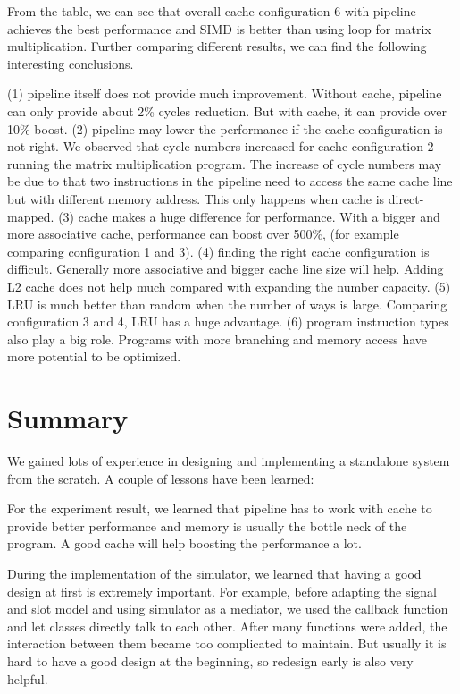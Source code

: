 \documentclass{sig-alternate}
\begin{document}
From the table, we can see that overall cache configuration 6 with pipeline achieves the best performance and SIMD is better than using loop for matrix multiplication. Further comparing different results, we can find the following interesting conclusions. 

(1) pipeline itself does not provide much improvement. Without cache, pipeline can only provide about 2\% cycles reduction. But with cache, it can provide over 10\% boost. (2) pipeline may lower the performance if the cache configuration is not right. We observed that cycle numbers increased for cache configuration 2  running the matrix multiplication program. The increase of cycle numbers may be due to that two instructions in the pipeline need to access the same cache line but with different memory address. This only happens when cache is direct-mapped. (3) cache makes a huge difference for performance. With a bigger and more associative cache, performance can boost over 500\%, (for example comparing configuration 1 and 3). (4) finding the right cache configuration is difficult. Generally more associative and bigger cache line size will help. Adding L2 cache does not help much compared with expanding the number capacity. (5) LRU is much better than random when the number of ways is large. Comparing configuration 3 and 4, LRU has a huge advantage. (6) program instruction types also play a big role. Programs with more branching and memory access have more potential to be optimized. 

\section{Summary}
We gained lots of experience in designing and implementing a standalone system from the scratch. A couple of lessons have been learned:

For the experiment result, we learned that pipeline has to work with cache to provide better performance and memory is usually the bottle neck of the program. A good cache will help boosting the performance a lot. 

During the implementation of the simulator, we learned that having a good design at first is extremely important. For example, before adapting the signal and slot model and using simulator as a mediator, we used the callback function and let classes directly talk to each other. After many functions were added, the interaction between them became too complicated to maintain. But usually it is hard to have a good design at the beginning, so redesign early is also very helpful. 
\end{document}
